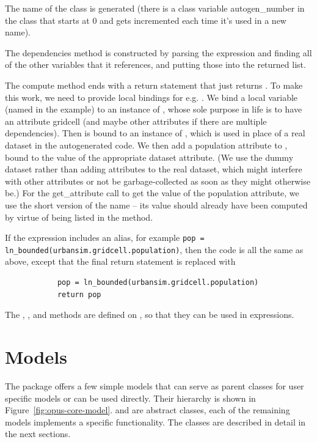 {The name of the class is generated (there is a class variable
autogen_number in the class  that starts at 0
and gets incremented each time it's used in a new name).

The dependencies method is constructed by parsing the expression and
finding all of the other variables that it references, and putting those
into the returned list.

The compute method ends with a return statement that just returns
.  To make this work, we need to provide local bindings for
e.g. .  We bind a local variable (named
 in the example) to an instance of , whose
sole purpose in life is to have an attribute gridcell (and maybe other
attributes if there are multiple dependencies).  Then
 is bound to an instance of ,
which is used in place of a real dataset in the autogenerated code.  We
then add a population attribute to , bound to the
value of the appropriate dataset attribute.  (We use the dummy dataset
rather than adding attributes to the real dataset, which might interfere
with other attributes or not be garbage-collected as soon as they might
otherwise be.)  For the get_attribute call to get the value of the
population attribute, we use the short version of the name -- its value
should already have been computed by virtue of being listed in the
 method.

If the expression includes an alias, for example
\verb|pop = ln_bounded(urbansim.gridcell.population)|, then the code is all
the same as above, except that the final return statement is replaced with
\begin{verbatim}
            pop = ln_bounded(urbansim.gridcell.population)
            return pop
\end{verbatim}

The , , and 
methods are defined on , so that they can be used in
expressions.

\section{Models} 
\label{sec:opus-core-models}

The  package offers a few simple models that can serve as parent classes
for user specific models or can be used directly. Their hierarchy is shown in
Figure~\ref{fig:opus-core-model}.  and  are abstract
classes, each of the remaining models implements a specific 
functionality. The classes are described in detail in the next sections.

}
